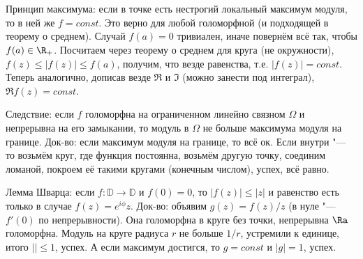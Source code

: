 \section{} %
	Принцип максимума: если в точке есть нестрогий локальный максимум модуля, то в ней же $f=const$.
	Это верно для любой голоморфной (и подходящей в теорему о среднем).
	Случай $f(a)=0$ тривиален, иначе повернём всё так, чтобы $f(a)\in \R_+$.
	Посчитаем через теорему о среднем для круга (не окружности), $f(z)\le|f(z)|\le f(a)$,
	получим, что везде равенства, т.е. $|f(z)|=const$.
	Теперь аналогично, дописав везде $\Re$ и $\Im$ (можно занести под интеграл), $\Re f(z) = const$.

	Следствие: если $f$ голоморфна на ограниченном линейно связном $\Omega$ и непрерывна на его замыкании,
	то модуль в $\Omega$ не больше максимума модуля на границе.
	Док-во: если максимум модуля на границе, то всё ок.
	Если внутри "--- то возьмём круг, где функция постоянна, возьмём другую точку,
	соединим ломаной, покроем её такими кругами (конечным числом), успех, всё равно.

	Лемма Шварца: если $f\colon \mathbb{D} \to \mathbb{D}$ и $f(0)=0$, то $|f(z)|\le |z|$
	и равенство есть только в случае $f(z)=e^{i\phi} z$.
	Док-во: объявим $g(z)=f(z)/z$ (в нуле "--- $f'(0)$ по непрерывности).
	Она голоморфна в круге без точки, непрерывна $\Ra$ голоморфна.
	Модуль на круге радиуса $r$ не больше $1/r$, устремили к единице, итого $|| \le 1$, успех.
	А если максимум достигся, то $g=const$ и $|g|=1$, успех.
